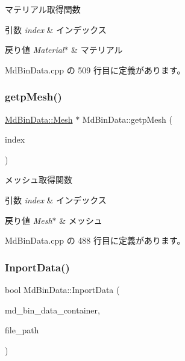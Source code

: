 マテリアル取得関数 


\begin{DoxyParams}{引数}
{\em index} & インデックス \\
\hline
\end{DoxyParams}

\begin{DoxyRetVals}{戻り値}
{\em Material$\ast$} & マテリアル \\
\hline
\end{DoxyRetVals}


 Md\+Bin\+Data.\+cpp の 509 行目に定義があります。

\mbox{\label{class_md_bin_data_a8a5dfdabb48917851cea4faa7faf4e35}} 
\subsubsection{\texorpdfstring{getp\+Mesh()}{getpMesh()}}
{\footnotesize\ttfamily \mbox{\hyperlink{class_md_bin_data_1_1_mesh}{Md\+Bin\+Data\+::\+Mesh}} $\ast$ Md\+Bin\+Data\+::getp\+Mesh (\begin{DoxyParamCaption}\item[{int}]{index }\end{DoxyParamCaption})}



メッシュ取得関数 


\begin{DoxyParams}{引数}
{\em index} & インデックス \\
\hline
\end{DoxyParams}

\begin{DoxyRetVals}{戻り値}
{\em Mesh$\ast$} & メッシュ \\
\hline
\end{DoxyRetVals}


 Md\+Bin\+Data.\+cpp の 488 行目に定義があります。

\mbox{\label{class_md_bin_data_a75fdc719dd711d95d3cd7519132a2ba4}} 
\subsubsection{\texorpdfstring{Inport\+Data()}{InportData()}}
{\footnotesize\ttfamily bool Md\+Bin\+Data\+::\+Inport\+Data (\begin{DoxyParamCaption}\item[{\mbox{\hyperlink{class_md_bin_data}{Md\+Bin\+Data}} $\ast$}]{md\+\_\+bin\+\_\+data\+\_\+container,  }\item[{std\+::string}]{file\+\_\+path }\end{DoxyParamCaption})\hspace{0.3cm}{\ttfamily [static]}}



